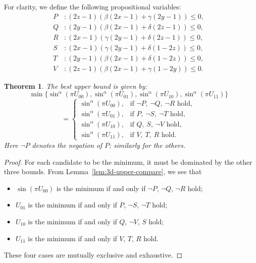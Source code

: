 \documentclass[12pt]{amsart}
\newtheorem{theorem}{Theorem}[section]
\theoremstyle{definition}
\begin{document}
For clarity, we define the following propositional variables:
\begin{align*}
P &: (2z-1)(\beta(2x-1) + \gamma(2y-1)) \leq 0, \\
Q &: (2y-1)(\beta(2x-1) + \delta(2z-1)) \leq 0, \\
R &: (2x-1)(\gamma(2y-1) + \delta(2z-1)) \leq 0, \\
S &: (2x-1)(\gamma(2y-1) + \delta(1-2z)) \leq 0, \\
T &: (2y-1)(\beta(2x-1) + \delta(1-2z)) \leq 0, \\
V &: (2z-1)(\beta(2x-1) + \gamma(1-2y)) \leq 0.
\end{align*}

\begin{theorem}\label{thm:3d-upper-best}
The best upper bound is given by:
\[
\min\{\sin^{\alpha}(\pi U_{00}), \sin^{\alpha}(\pi U_{01}), \sin^{\alpha}(\pi U_{10}), \sin^{\alpha}(\pi U_{11})\}
\]
\[
=
\begin{cases}
\sin^{\alpha}(\pi U_{00}), & \text{if } \neg P,\ \neg Q,\ \neg R \text{ hold},\\
\sin^{\alpha}(\pi U_{01}), & \text{if } P,\ \neg S,\ \neg T \text{ hold},\\
\sin^{\alpha}(\pi U_{10}), & \text{if }  Q,\ S,\ \neg V \text{ hold},\\
\sin^{\alpha}(\pi U_{11}), & \text{if } V,\ T,\ R \text{ hold}.
\end{cases}
\]
Here $\neg P$ denotes the negation of $P$; similarly for the others.
\end{theorem}

\begin{proof}
For each candidate to be the minimum, it must be dominated by the other three bounds. From Lemma~\ref{lem:3d-upper-compare}, we see that

\begin{itemize}
\item[(i)] $\sin(\pi U_{00})$ is the minimum if and only if $\neg P$, $\neg Q$, $\neg R$ hold;
\item[(ii)] $U_{01}$ is the minimum if and only if $P$, $\neg S$, $\neg T$ hold;
\item[(iii)] $U_{10}$ is the minimum if and only if $ Q$, $\neg V$, $S$ hold;
\item[(iv)] $U_{11}$ is the minimum if and only if $V$, $T$, $R$ hold.
\end{itemize}

These four cases are mutually exclusive and exhaustive.
\end{proof}
\end{document}
